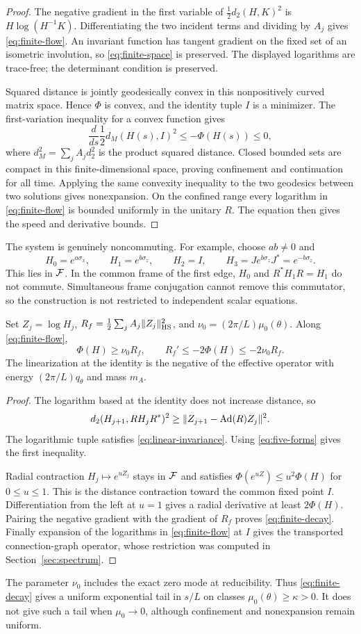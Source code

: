 \begin{proof}
The negative gradient in the first variable of
$\tfrac12d_2(H,K)^2$ is $H\log(H^{-1}K)$. Differentiating the two
incident terms and dividing by $A_j$ gives \eqref{eq:finite-flow}.
An invariant function has tangent gradient on the fixed set of an
isometric involution, so \eqref{eq:finite-space} is preserved. The
displayed logarithms are trace-free; the determinant condition is preserved.

Squared distance is jointly geodesically convex in this nonpositively
curved matrix space. Hence $\Phi$ is convex, and the identity tuple $I$
is a minimizer. The first-variation inequality for a convex function
gives
\[
 \frac{d}{ds}\frac12d_M(H(s),I)^2\le-\Phi(H(s))\le0,
\]
where $d_M^2=\sum_jA_jd_2^2$ is the product squared distance.
Closed bounded sets are compact in this finite-dimensional space,
proving confinement and continuation for all time. Applying the same
convexity inequality to the two geodesics between two solutions gives
nonexpansion. On the confined range every logarithm in
\eqref{eq:finite-flow} is bounded uniformly in the unitary $R$.
The equation then gives the speed and derivative bounds.
\end{proof}

The system is genuinely noncommuting. For example, choose $ab\ne0$ and
\[
 H_0=e^{a\sigma_x},\qquad H_1=e^{b\sigma_z},\qquad
 H_2=I,\qquad H_3=Je^{b\sigma_z}J^*=e^{-b\sigma_z}.
\]
This lies in $\mathcal F$. In the common frame of the first edge,
$H_0$ and $R^*H_1R=H_1$ do not commute. Simultaneous frame conjugation
cannot remove this commutator, so the construction is not restricted
to independent scalar equations.

\begin{lemma}\label{lem:finite-decay}
Set $Z_j=\log H_j$,
$R_f=\tfrac12\sum_jA_j\|Z_j\|_{\mathrm{HS}}^2$, and
$\nu_0=(2\pi/L)\mu_0(\theta)$. Along \eqref{eq:finite-flow},
\begin{equation}\label{eq:finite-decay}
 \Phi(H)\ge\nu_0R_f,\qquad
 R_f'\le-2\Phi(H)\le-2\nu_0R_f.
\end{equation}
The linearization at the identity is the negative of the effective
operator with energy $(2\pi/L)q_\theta$ and mass $m_A$.
\end{lemma}

\begin{proof}
The logarithm based at the identity does not increase distance, so
\[
 d_2(H_{j+1},RH_jR^*)^2
       \ge\|Z_{j+1}-\operatorname{Ad}(R)Z_j\|^2.
\]
The logarithmic tuple satisfies \eqref{eq:linear-invariance}.
Using \eqref{eq:five-forms} gives the first inequality.

Radial contraction $H_j\mapsto e^{uZ_j}$ stays in $\mathcal F$ and satisfies
$\Phi(e^{uZ})\le u^2\Phi(H)$ for $0\le u\le1$. This is the
distance contraction toward the common fixed point $I$. Differentiation
from the left at $u=1$ gives a radial derivative at least $2\Phi(H)$.
Pairing the negative gradient with the gradient of $R_f$ proves
\eqref{eq:finite-decay}. Finally expansion of the logarithms in
\eqref{eq:finite-flow} at $I$ gives the transported connection-graph
operator, whose restriction was computed in Section~\ref{sec:spectrum}.
\end{proof}

The parameter $\nu_0$ includes the exact zero mode at reducibility.
Thus \eqref{eq:finite-decay} gives a uniform exponential tail in $s/L$
on classes $\mu_0(\theta)\ge\kappa>0$. It does not give such a tail
when $\mu_0\to0$, although confinement and nonexpansion remain uniform.
